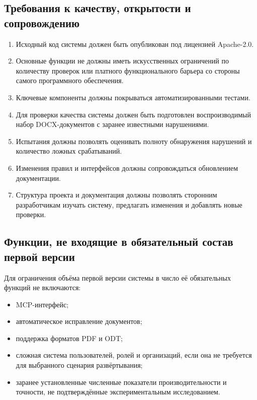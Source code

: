 \documentclass[a4paper,14pt]{extarticle}
\begin{document}
\subsection{Требования к качеству, открытости и сопровождению}

\begin{enumerate}
    \item Исходный код системы должен быть опубликован под лицензией Apache-2.0.
    \item Основные функции не должны иметь искусственных ограничений по количеству проверок или платного функционального барьера со стороны самого программного обеспечения.
    \item Ключевые компоненты должны покрываться автоматизированными тестами.
    \item Для проверки качества системы должен быть подготовлен воспроизводимый набор DOCX-документов с заранее известными нарушениями.
    \item Испытания должны позволять оценивать полноту обнаружения нарушений и количество ложных срабатываний.
    \item Изменения правил и интерфейсов должны сопровождаться обновлением документации.
    \item Структура проекта и документация должны позволять сторонним разработчикам изучать систему, предлагать изменения и добавлять новые проверки.
\end{enumerate}

\subsection{Функции, не входящие в обязательный состав первой версии}

Для ограничения объёма первой версии системы в число её обязательных функций не включаются:

\begin{itemize}
    \item MCP-интерфейс;
    \item автоматическое исправление документов;
    \item поддержка форматов PDF и ODT;
    \item сложная система пользователей, ролей и организаций, если она не требуется для выбранного сценария развёртывания;
    \item заранее установленные численные показатели производительности и точности, не подтверждённые экспериментальным исследованием.
\end{itemize}
\end{document}
